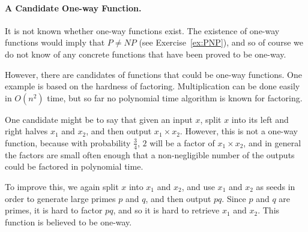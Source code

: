\paragraph{A Candidate One-way Function.}
It is not known whether one-way functions exist.  The existence of one-way functions would imply that $P \neq NP$ (see Exercise~\ref{ex:PNP}), and so of course we do not know of any concrete functions that have been proved to be one-way.

However, there are candidates of functions that could be one-way functions.  One example is based on the hardness of factoring.  Multiplication can be done easily in $O(n^2)$ time, but so far no polynomial time algorithm is known for factoring.

One candidate might be to say that given an input $x$, split $x$ into its left and right halves $x_1$ and $x_2$, and then output $x_1 \times x_2$.  However, this is not a one-way function, because with probability $\frac{3}{4}$, $2$ will be a factor of $x_1 \times x_2$, and in general the factors are small often enough that a non-negligible number of the outputs could be factored in polynomial time.

To improve this, we again split $x$ into $x_1$ and $x_2$, and use $x_1$ and $x_2$ as seeds in order to generate large primes $p$ and $q$, and then output $pq$.  Since $p$ and $q$ are primes, it is hard to factor $pq$, and so it is hard to retrieve $x_1$ and $x_2$.  This function is believed to be one-way.


